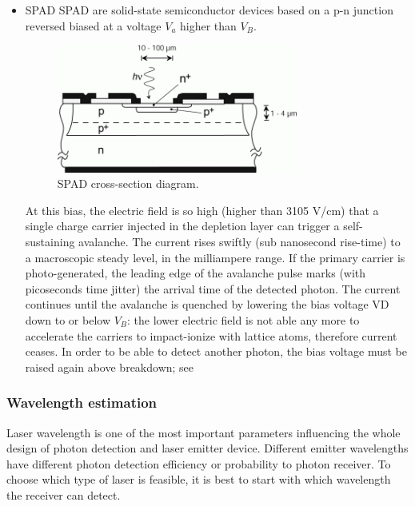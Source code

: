 \begin{itemize}
\item \acl{SPAD}
\acs{SPAD} are solid-state semiconductor devices based on a p-n junction reversed biased at a voltage $V_{a}$ higher than $V_{B}$.

\begin{figure}[ht!]
\centering
\includegraphics[width=0.75\textwidth]{chapters/img/SPAD_Cross-section.png}
\caption{\acs{SPAD} cross-section diagram.}
\label{fig:SPAD_cross-section}
\end{figure}

At this bias, the electric field is so high (higher than 3105 V/cm) that a single charge carrier injected in the depletion layer can trigger a self-sustaining avalanche. The current rises swiftly (sub nanosecond rise-time) to a macroscopic steady level, in the milliampere range. If the primary carrier is photo-generated, the leading edge of the avalanche pulse marks (with picoseconds time jitter) the arrival time of the detected photon. The current continues until the avalanche is quenched by lowering the bias voltage VD down to or below $V_{B}$: the lower electric field is not able any more to accelerate the carriers to impact-ionize with lattice atoms, therefore current ceases. In order to be able to detect another photon, the bias voltage must be raised again above breakdown; see \cite{SPAD_intro}

\end{itemize}

\subsubsection{Wavelength estimation}
\label{introReceiver}
Laser wavelength is one of the most important parameters influencing the whole design of photon detection and \acs{laser} emitter device. Different emitter wavelengths have different photon detection efficiency or probability to photon receiver. To choose which type of \acs{laser} is feasible, it is best to start with which wavelength the receiver can detect.

